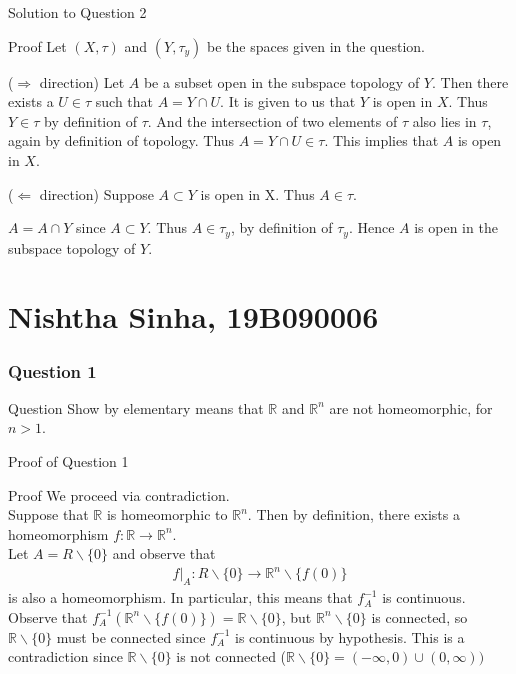 \documentclass{beamer}
\begin{document}
\begin{frame}{Solution to Question 2}
\begin{block}{Proof}
Let $(X, \tau)$ and $(Y, \tau_y)$ be the spaces given in the question. 

($\Rightarrow$ direction) Let $A$ be a subset open in the subspace topology of $Y$. Then there exists a $U \in \tau$ such that $A = Y \cap U$. It is given to us that $Y$ is open in $X$. Thus $Y \in \tau$ by definition of $\tau$. 
And the intersection of two elements of $\tau$ also lies in $\tau$, again by definition of topology. 
Thus $A = Y \cap U \in \tau$. This implies that $A$ is open in $X$. 

($\Leftarrow$ direction) Suppose $A \subset Y$ is open in X. Thus $A \in \tau$. 

$A = A \cap Y$ since $A \subset Y$. Thus $A \in \tau_y$, by definition of $\tau_y$. Hence $A$ is open in the subspace topology of $Y$. \qedsymbol 

\end{block}
\end{frame}

\section{Nishtha Sinha, 19B090006}

\begin{frame}
\frametitle{Question 1}
\begin{block}{Question}
Show by elementary means that $\mathbb{R}$ and $\mathbb{R}^n$ are not homeomorphic, for $n>1$.
\end{block}
\end{frame}

\begin{frame}{Proof of Question 1}
\begin{block}{Proof}
We proceed via contradiction.\\
Suppose that $\mathbb{R}$ is homeomorphic to $\mathbb{R}^n$. Then by definition, there exists a homeomorphism $f : \mathbb{R} \to \mathbb{R}^n$. \\
Let $A = R \backslash \{0\}$ and observe that 
\begin{align*}
    f|_{A} : R \backslash \{0\} \to \mathbb{R}^n \backslash \{f(0)\}
\end{align*} is also a homeomorphism. In particular, this means that $f_{A}^{-1}$ is continuous. Observe that $f_{A}^{-1} (\mathbb{R}^{n} \backslash \{f(0)\}) = \mathbb{R} \backslash \{0\} $, but $\mathbb{R}^n \backslash \{0\}$ is connected, so $\mathbb{R} \backslash \{0\}$ must be connected since $f_{A}^{-1}$
is continuous by hypothesis. This is a contradiction since $\mathbb{R} \backslash \{0\}$ is not connected ($\mathbb{R} \backslash \{0\} = (-\infty, 0) \cup (0, \infty))$
\end{block}

\end{frame}
\end{document}
